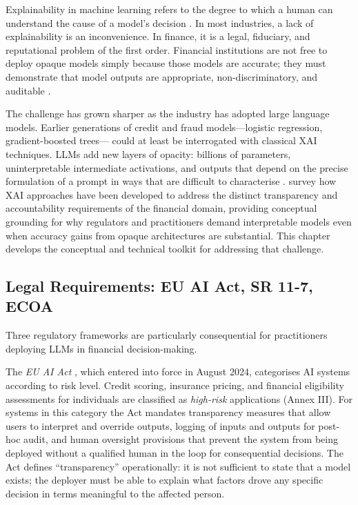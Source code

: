 Explainability in machine learning refers to the degree to which a human can understand
the cause of a model's decision \cite{miller2019explanation}. In most industries, a lack
of explainability is an inconvenience. In finance, it is a legal, fiduciary, and
reputational problem of the first order. Financial institutions are not free to deploy
opaque models simply because those models are accurate; they must demonstrate that model
outputs are appropriate, non-discriminatory, and auditable \cite{sr117}.

The challenge has grown sharper as the industry has adopted large language models. Earlier
generations of credit and fraud models---logistic regression, gradient-boosted trees---
could at least be interrogated with classical XAI techniques. LLMs add new layers of
opacity: billions of parameters, uninterpretable intermediate activations, and outputs
that depend on the precise formulation of a prompt in ways that are difficult to
characterise \cite{arrieta2020explainable}. \citet{RaneChoudharyRane2023} survey how XAI approaches have been developed to address
the distinct transparency and accountability requirements of the financial domain,
providing conceptual grounding for why regulators and practitioners demand interpretable
models even when accuracy gains from opaque architectures are substantial. This chapter
develops the conceptual and technical toolkit for addressing that challenge.

\subsection{Legal Requirements: EU AI Act, SR 11-7, ECOA}
\label{sec:ch12-legal-requirements}

Three regulatory frameworks are particularly consequential for practitioners deploying
LLMs in financial decision-making.

The \emph{EU AI Act} \cite{euaiact2024}, which entered into force in August 2024,
categorises AI systems according to risk level. Credit scoring, insurance pricing, and
financial eligibility assessments for individuals are classified as \emph{high-risk}
applications (Annex III). For systems in this category the Act mandates transparency
measures that allow users to interpret and override outputs, logging of inputs and outputs
for post-hoc audit, and human oversight provisions that prevent the system from being
deployed without a qualified human in the loop for consequential decisions. The Act
defines ``transparency'' operationally: it is not sufficient to state that a model exists;
the deployer must be able to explain what factors drove any specific decision in terms
meaningful to the affected person.

